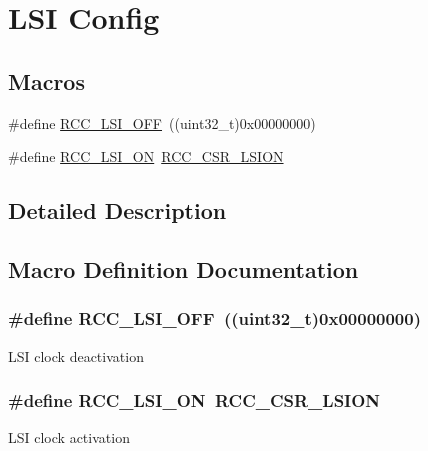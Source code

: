 \hypertarget{group___r_c_c___l_s_i___config}{\section{L\-S\-I Config}
\label{group___r_c_c___l_s_i___config}
}
\subsection*{Macros}
\begin{DoxyCompactItemize}
\item 
\#define \hyperlink{group___r_c_c___l_s_i___config_gaa1710927d79a2032f87f039c4a27356a}{R\-C\-C\-\_\-\-L\-S\-I\-\_\-\-O\-F\-F}~((uint32\-\_\-t)0x00000000)
\item 
\#define \hyperlink{group___r_c_c___l_s_i___config_ga6b364ac3500e60b6bff695ee518c87d6}{R\-C\-C\-\_\-\-L\-S\-I\-\_\-\-O\-N}~\hyperlink{group___peripheral___registers___bits___definition_ga803cbf97bda1ebaf9afee2a3c9f0851b}{R\-C\-C\-\_\-\-C\-S\-R\-\_\-\-L\-S\-I\-O\-N}
\end{DoxyCompactItemize}


\subsection{Detailed Description}


\subsection{Macro Definition Documentation}
\hypertarget{group___r_c_c___l_s_i___config_gaa1710927d79a2032f87f039c4a27356a}{
\subsubsection[{R\-C\-C\-\_\-\-L\-S\-I\-\_\-\-O\-F\-F}]{\setlength{\rightskip}{0pt plus 5cm}\#define R\-C\-C\-\_\-\-L\-S\-I\-\_\-\-O\-F\-F~((uint32\-\_\-t)0x00000000)}}\label{group___r_c_c___l_s_i___config_gaa1710927d79a2032f87f039c4a27356a}
L\-S\-I clock deactivation \hypertarget{group___r_c_c___l_s_i___config_ga6b364ac3500e60b6bff695ee518c87d6}{
\subsubsection[{R\-C\-C\-\_\-\-L\-S\-I\-\_\-\-O\-N}]{\setlength{\rightskip}{0pt plus 5cm}\#define R\-C\-C\-\_\-\-L\-S\-I\-\_\-\-O\-N~{\bf R\-C\-C\-\_\-\-C\-S\-R\-\_\-\-L\-S\-I\-O\-N}}}\label{group___r_c_c___l_s_i___config_ga6b364ac3500e60b6bff695ee518c87d6}
L\-S\-I clock activation 
